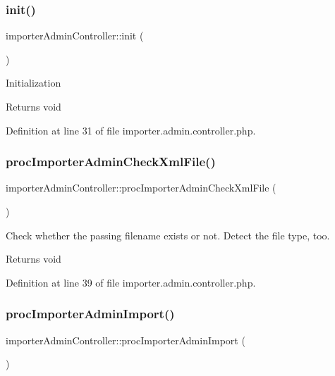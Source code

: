 \subsubsection{\texorpdfstring{init()}{init()}}
{\footnotesize\ttfamily importer\+Admin\+Controller\+::init (\begin{DoxyParamCaption}{ }\end{DoxyParamCaption})}

Initialization \begin{DoxyReturn}{Returns}
void 
\end{DoxyReturn}


Definition at line 31 of file importer.\+admin.\+controller.\+php.

\hypertarget{classimporterAdminController_aa553a8db633713f858c1064a5b8fa621}{}\label{classimporterAdminController_aa553a8db633713f858c1064a5b8fa621} 
\subsubsection{\texorpdfstring{proc\+Importer\+Admin\+Check\+Xml\+File()}{procImporterAdminCheckXmlFile()}}
{\footnotesize\ttfamily importer\+Admin\+Controller\+::proc\+Importer\+Admin\+Check\+Xml\+File (\begin{DoxyParamCaption}{ }\end{DoxyParamCaption})}

Check whether the passing filename exists or not. Detect the file type, too. \begin{DoxyReturn}{Returns}
void 
\end{DoxyReturn}


Definition at line 39 of file importer.\+admin.\+controller.\+php.

\hypertarget{classimporterAdminController_a51a0e3d1bccf3f7c539b119bf394d572}{}\label{classimporterAdminController_a51a0e3d1bccf3f7c539b119bf394d572} 
\subsubsection{\texorpdfstring{proc\+Importer\+Admin\+Import()}{procImporterAdminImport()}}
{\footnotesize\ttfamily importer\+Admin\+Controller\+::proc\+Importer\+Admin\+Import (\begin{DoxyParamCaption}{ }\end{DoxyParamCaption})}

